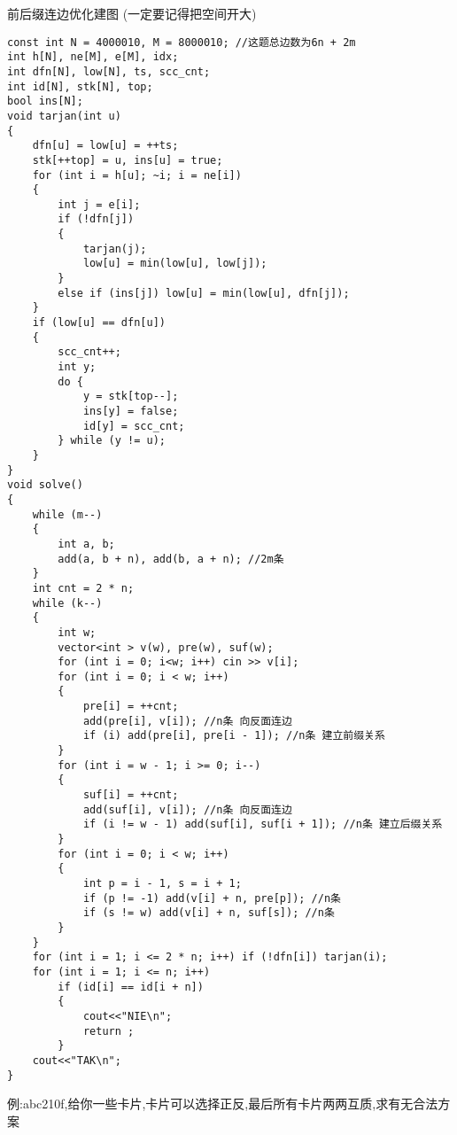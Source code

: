 \documentclass[a4paper, fontset=none]{ctexart}
\begin{document}
前后缀连边优化建图 (一定要记得把空间开大)
\begin{verbatim}
const int N = 4000010, M = 8000010; //这题总边数为6n + 2m
int h[N], ne[M], e[M], idx;
int dfn[N], low[N], ts, scc_cnt;
int id[N], stk[N], top;
bool ins[N];
void tarjan(int u)
{
    dfn[u] = low[u] = ++ts;
    stk[++top] = u, ins[u] = true;
    for (int i = h[u]; ~i; i = ne[i])
    {
        int j = e[i];
        if (!dfn[j])
        {
            tarjan(j);
            low[u] = min(low[u], low[j]);
        }
        else if (ins[j]) low[u] = min(low[u], dfn[j]);
    }
    if (low[u] == dfn[u])
    {
        scc_cnt++;
        int y;
        do {
            y = stk[top--];
            ins[y] = false;
            id[y] = scc_cnt;
        } while (y != u);
    }
}
void solve()
{
    while (m--)
    {
        int a, b;
        add(a, b + n), add(b, a + n); //2m条
    }
    int cnt = 2 * n;
    while (k--)
    {
        int w;
        vector<int > v(w), pre(w), suf(w);
        for (int i = 0; i<w; i++) cin >> v[i];
        for (int i = 0; i < w; i++)
        {
            pre[i] = ++cnt;
            add(pre[i], v[i]); //n条 向反面连边
            if (i) add(pre[i], pre[i - 1]); //n条 建立前缀关系
        }
        for (int i = w - 1; i >= 0; i--)
        {
            suf[i] = ++cnt;
            add(suf[i], v[i]); //n条 向反面连边
            if (i != w - 1) add(suf[i], suf[i + 1]); //n条 建立后缀关系
        }
        for (int i = 0; i < w; i++)
        {
            int p = i - 1, s = i + 1;
            if (p != -1) add(v[i] + n, pre[p]); //n条
            if (s != w) add(v[i] + n, suf[s]); //n条
        }
    }
    for (int i = 1; i <= 2 * n; i++) if (!dfn[i]) tarjan(i);
    for (int i = 1; i <= n; i++)
        if (id[i] == id[i + n])
        {
            cout<<"NIE\n";
            return ;
        }
    cout<<"TAK\n";
}
\end{verbatim}

例:abc210f,给你一些卡片,卡片可以选择正反,最后所有卡片两两互质,求有无合法方案
\end{document}
